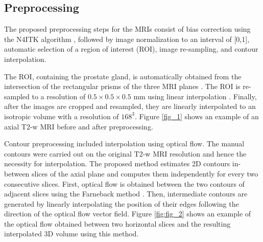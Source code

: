 \subsection{Preprocessing}
\label{subsec:prepro}
The proposed preprocessing steps for the MRIs consist of bias correction using the N4ITK algorithm \cite{n4itk}, followed by image normalization to an interval of [0,1], automatic selection of a region of interest (ROI), image re-sampling, and contour interpolation.  

The ROI, containing the prostate gland, is automatically obtained from the intersection of the rectangular prisms of the three MRI planes \cite{anneke}. The ROI is re-sampled to a resolution of $0.5 \times 0.5 \times 0.5$ mm  using linear interpolation \cite{itk}. Finally, after the images are cropped and resampled, they are linearly interpolated to an isotropic volume with a resolution of $168^3$. Figure \ref{fig_1} shows an example of an axial T2-w MRI before and after preprocessing.

Contour preprocessing included interpolation using optical flow.  The manual contours were carried out on the original T2-w MRI resolution and hence the necessity for interpolation. The proposed method estimates 2D contours in-between slices of the axial plane and computes them independently for every two consecutive slices. First, optical flow is obtained between the two contours of adjacent slices using the Farneback method \cite{optflow}. Then, intermediate contours are generated by linearly interpolating the position of their edges following the direction of the optical flow vector field. Figure \ref{fig:fig_2} shows an example of the optical flow obtained between two horizontal slices and the resulting interpolated 3D volume using this method. 
